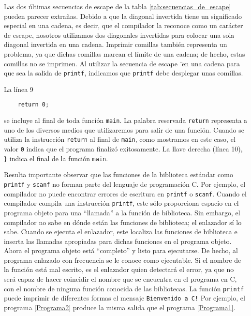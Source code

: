 Las dos últimas secuencias de escape de la tabla \ref{tab:secuencias_de_escape} pueden parecer extrañas. Debido a que la diagonal invertida tiene un significado especial en una cadena, es decir, que el compilador la reconoce como un carácter de escape, nosotros utilizamos dos diagonales invertidas para colocar una sola diagonal invertida en una cadena. Imprimir comillas también representa un problema, ya que dichas comillas marcan el límite de una cadena; de hecho, estas comillas no se imprimen. Al utilizar la secuencia de escape \texttt{\"} en una cadena para que sea la salida de \texttt{printf}, indicamos que \texttt{printf} debe desplegar unas comillas.

La línea 9
\begin{verbatim}
    return 0;
\end{verbatim}
\noindent se incluye al final de toda función \texttt{main}. La palabra reservada \texttt{return} representa a uno de los diversos medios que utilizaremos para salir de una función. Cuando se utiliza la instrucción \texttt{return} al final de \texttt{main}, como mostramos en este caso, el valor \texttt{0} indica que el programa finalizó exitosamente. La llave derecha (línea 10), \verb|}| indica el final de la función \texttt{main}.

Resulta importante observar que las funciones de la biblioteca estándar como \texttt{printf} y \texttt{scanf} no forman parte del lenguaje de programación C. Por ejemplo, el compilador no puede encontrar errores de escritura en \texttt{printf} o \texttt{scanf}. Cuando el compilador compila una instrucción \texttt{printf}, este sólo proporciona espacio en el programa objeto para una “llamada” a la función de biblioteca. Sin embargo, el compilador no sabe en dónde están las funciones de biblioteca; el enlazador sí lo sabe. Cuando se ejecuta el enlazador, este localiza las funciones de biblioteca e inserta las llamadas apropiadas para dichas funciones en el programa objeto. Ahora el programa objeto está “completo” y listo para ejecutarse. De hecho, al programa enlazado con frecuencia se le conoce como ejecutable. Si el nombre de la función está mal escrito, es el enlazador quien detectará el error, ya que no será capaz de hacer coincidir el nombre que se encuentra en el programa en C, con el nombre de ninguna función conocida de las bibliotecas. La función \texttt{printf} puede imprimir de diferentes formas el mensaje \texttt{Bienvenido a C!} Por ejemplo, el programa \ref{Programa2} produce la misma salida que el programa \ref{Programa1}. 

